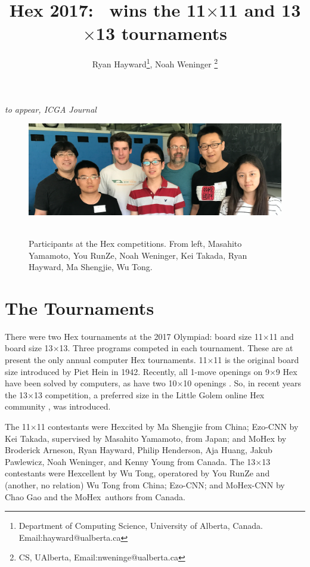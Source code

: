 \documentclass{icga}
\title{\sc Hex 2017: \Mx\ wins the 11$\times$11 and 13$\times$13 tournaments}
\author{Ryan Hayward\thanks{Department of Computing Science, 
University of Alberta, Canada. Email:hayward@ualberta.ca},
Noah Weninger \thanks{CS, UAlberta, Email:nweninge@ualberta.ca}
}
\affiliation{Edmonton, Canada}
\newif\iflong\longtrue  %
\def\Ec{\mbox{\sc Ezo-CNN}}
\def\Hite{\mbox{\sc Hexcited}}
\def\Hent{\mbox{\sc Hexcellent}}
\def\Mx{\mbox{\sc MoHex}}
\def\Mc{\mbox{\sc MoHex-CNN}}
\begin{document}
\maketitle


\vspace*{-2.25in}
{\it to appear, ICGA Journal}
\vspace*{2.0in}

\begin{figure}[hbt]
\includegraphics[width=\columnwidth]{photos/people-1.eps}\
\caption{Participants at the Hex competitions. From left,
Masahito Yamamoto,
You RunZe,
Noah Weninger,
Kei Takada,
Ryan Hayward,
Ma Shengjie,
Wu Tong.} \end{figure}

\section{The Tournaments}
There were two Hex tournaments at the 2017 Olympiad:
board size 11$\times$11 and board size 13$\times$13.
Three programs competed in each tournament.
These are at present the only annual computer Hex tournaments.
11$\times$11 is the original board size introduced by Piet Hein in 1942. 
Recently, all 1-move openings on 9$\times$9 Hex have been solved by
computers, as have two 10$\times$10 openings \citebay{PawlH13}.
So, in recent years the 13$\times$13 competition,
a preferred size in the Little Golem online Hex community , 
was introduced.

The 11$\times$11 contestants were
\Hite{} by Ma Shengjie from China;
\Ec{} by Kei Takada, supervised by Masahito Yamamoto, from Japan;
and \Mx{}
by Broderick Arneson, Ryan Hayward, Philip Henderson, Aja Huang, 
Jakub Pawlewicz, Noah Weninger, and Kenny Young from Canada.
The 13$\times$13 contestants were
\Hent{} by Wu Tong, operatored by You RunZe and (another, no relation)
Wu Tong from China;
\Ec{}; and
\Mc{} by Chao Gao and the \Mx\ authors from Canada.
\end{document}
